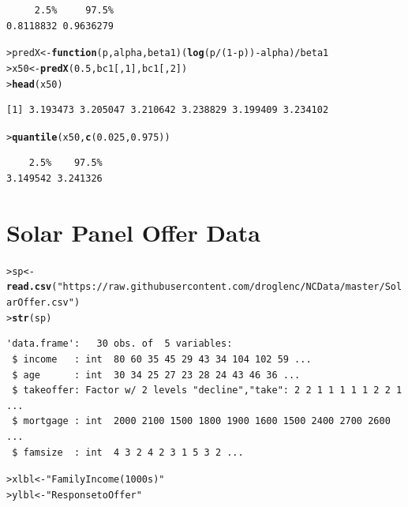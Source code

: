 \documentclass{article}\usepackage[]{graphicx}\usepackage[]{color}
\makeatletter
\newcommand{\hlnum}[1]{\textcolor[rgb]{0.686,0.059,0.569}{#1}}%
\newcommand{\hlstr}[1]{\textcolor[rgb]{0.192,0.494,0.8}{#1}}%
\newcommand{\hlopt}[1]{\textcolor[rgb]{0,0,0}{#1}}%
\newcommand{\hlstd}[1]{\textcolor[rgb]{0.345,0.345,0.345}{#1}}%
\newcommand{\hlkwa}[1]{\textcolor[rgb]{0.161,0.373,0.58}{\textbf{#1}}}%
\newcommand{\hlkwb}[1]{\textcolor[rgb]{0.69,0.353,0.396}{#1}}%
\newcommand{\hlkwc}[1]{\textcolor[rgb]{0.333,0.667,0.333}{#1}}%
\newcommand{\hlkwd}[1]{\textcolor[rgb]{0.737,0.353,0.396}{\textbf{#1}}}%
\newenvironment{kframe}{%
 \def\at@end@of@kframe{}%
 \ifinner\ifhmode%
  \def\at@end@of@kframe{\end{minipage}}%
  \begin{minipage}{\columnwidth}%
 \fi\fi%
 \def\FrameCommand##1{\hskip\@totalleftmargin \hskip-\fboxsep
 \colorbox{shadecolor}{##1}\hskip-\fboxsep
     \hskip-\linewidth \hskip-\@totalleftmargin \hskip\columnwidth}%
 \MakeFramed {\advance\hsize-\width
   \@totalleftmargin\z@ \linewidth\hsize
   \@setminipage}}%
 {\par\unskip\endMakeFramed%
 \at@end@of@kframe}
\newenvironment{knitrout}{}{} %
\makeatother
\begin{document}
\begin{knitrout}
\begin{kframe}
\begin{verbatim}
     2.5%     97.5% 
0.8118832 0.9636279 
\end{verbatim}
\begin{alltt}
\hlstd{> }\hlstd{predX} \hlkwb{<-} \hlkwa{function}\hlstd{(}\hlkwc{p}\hlstd{,}\hlkwc{alpha}\hlstd{,}\hlkwc{beta1}\hlstd{) (}\hlkwd{log}\hlstd{(p}\hlopt{/}\hlstd{(}\hlnum{1}\hlopt{-}\hlstd{p))}\hlopt{-}\hlstd{alpha)}\hlopt{/}\hlstd{beta1}
\hlstd{> }\hlstd{x50} \hlkwb{<-} \hlkwd{predX}\hlstd{(}\hlnum{0.5}\hlstd{,bc1[,}\hlnum{1}\hlstd{],bc1[,}\hlnum{2}\hlstd{])}
\hlstd{> }\hlkwd{head}\hlstd{(x50)}
\end{alltt}
\begin{verbatim}
[1] 3.193473 3.205047 3.210642 3.238829 3.199409 3.234102
\end{verbatim}
\begin{alltt}
\hlstd{> }\hlkwd{quantile}\hlstd{(x50,}\hlkwd{c}\hlstd{(}\hlnum{0.025}\hlstd{,}\hlnum{0.975}\hlstd{))}
\end{alltt}
\begin{verbatim}
    2.5%    97.5% 
3.149542 3.241326 
\end{verbatim}
\end{kframe}
\end{knitrout}


\newpage
\section{Solar Panel Offer Data}
\begin{knitrout}
\color{fgcolor}\begin{kframe}
\begin{alltt}
\hlstd{> }\hlstd{sp} \hlkwb{<-} \hlkwd{read.csv}\hlstd{(}\hlstr{"https://raw.githubusercontent.com/droglenc/NCData/master/SolarOffer.csv"}\hlstd{)}
\hlstd{> }\hlkwd{str}\hlstd{(sp)}
\end{alltt}
\begin{verbatim}
'data.frame':	30 obs. of  5 variables:
 $ income   : int  80 60 35 45 29 43 34 104 102 59 ...
 $ age      : int  30 34 25 27 23 28 24 43 46 36 ...
 $ takeoffer: Factor w/ 2 levels "decline","take": 2 2 1 1 1 1 1 2 2 1 ...
 $ mortgage : int  2000 2100 1500 1800 1900 1600 1500 2400 2700 2600 ...
 $ famsize  : int  4 3 2 4 2 3 1 5 3 2 ...
\end{verbatim}
\begin{alltt}
\hlstd{> }\hlstd{xlbl} \hlkwb{<-} \hlstr{"Family Income (1000s)"}
\hlstd{> }\hlstd{ylbl} \hlkwb{<-} \hlstr{"Response to Offer"}
\end{alltt}
\end{kframe}
\end{knitrout}
\end{document}
